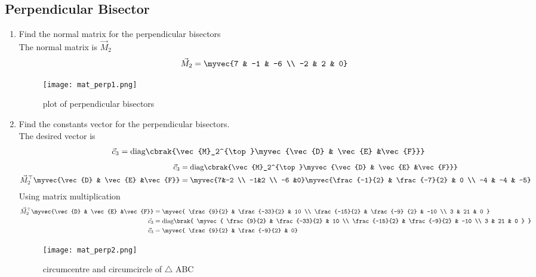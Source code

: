 \documentclass[11pt]{book}
\begin{document}
\subsection{Perpendicular Bisector}

  
\begin{enumerate}[label=\thesubsection.\arabic*.,ref=\thesubsection.\theenumi]
\item Find the normal matrix for the perpendicular bisectors \\
\solution The normal matrix is $\vec{M}_2$
\begin{align}
       \vec{M}_2 &=\myvec{7 & -1 & -6 \\ -2 & 2 & 0}
\end{align}
\begin{figure}[H]
    \centering
    \texttt{[image: mat\_perp1.png]}
    \caption{plot of perpendicular bisectors}
    \label{fig:mat_perp1}
\end{figure}
\item Find the constants vector for the perpendicular bisectors. \\
\solution The desired vector is 
\begin{align}
   \vec{c}_3 = \text{diag}\cbrak{\vec{M}_2^{\top}\myvec{\vec{D} & \vec{E} &\vec{F}}}
\end{align}
\solution
\begin{align}
   \vec{c}_3 &= \text{diag}\cbrak{\vec{M}_2^{\top}\myvec{\vec{D} & \vec{E} &\vec{F}}} \\
   \vec{M}_2^{\top}\myvec{\vec{D} & \vec{E} &\vec{F}} &= \myvec{7&-2 \\ -1&2 \\ -6 &0}\myvec{\frac{-1}{2} & \frac{-7}{2} & 
   0 \\ -4 & -4 & -5} \\
\end{align}
Using matrix multiplication
\begin{align}
  \vec{M}_2^{\top}\myvec{\vec{D} & \vec{E} &\vec{F}} &=\myvec{ \frac{9}{2} & \frac{-33}{2} & 10 \\ \frac{-15}{2} & 
  \frac{-9} 
  {2} & -10 \\ 3 & 21 & 0 } \\
  \vec{c}_3 &= \text{diag}\brak{ \myvec{ \frac{9}{2} & \frac{-33}{2} & 10 \\ \frac{-15}{2} & \frac{-9}{2} & -10 \\ 3 & 21 
   & 0 } } \\
  \vec{c}_3   &= \myvec{ \frac{9}{2} & \frac{-9}{2} & 0}
\end{align}
\begin{figure}[H]
    \centering
    \texttt{[image: mat\_perp2.png]}
    \caption{circumcentre and circumcircle of $\triangle$ ABC}
    \label{fig:mat_perp2}
\end{figure}
\end{enumerate}
\end{document}
